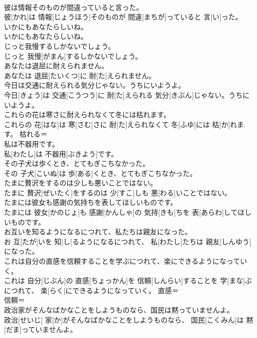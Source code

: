 \documentclass[8pt]{extreport}
\begin{document}
\begin{CJK}{UTF8}{min}
\\	彼は情報そのものが間違っていると言った。	
\\	彼[かれ]は 情報[じょうほう]そのものが 間違[まちが]っていると 言[い]った。	
\\	いかにもあなたらしいね。	
\\	いかにもあなたらしいね。	
\\	じっと我慢するしかないでしょう。	
\\	じっと 我慢[がまん]するしかないでしょう。	
\\	あなたは退屈に耐えられません。	
\\	あなたは 退屈[たいくつ]に 耐[た]えられません。	
\\	今日は交通に耐えられる気分じゃない。うちにいようよ。	
\\	今日[きょう]は 交通[こうつう]に 耐[た]えられる 気分[きぶん]じゃない。うちにいようよ。	
\\	これらの花は寒さに耐えられなくて冬には枯れます。	
\\	これらの 花[はな]は 寒[さむ]さに 耐[た]えられなくて 冬[ふゆ]には 枯[か]れます。	枯れる＝ 
\\	私は不器用です。	
\\	私[わたし]は 不器用[ぶきよう]です。	
\\	その子犬は歩くとき、とてもぎこちなかった。	
\\	その 子犬[こいぬ]は 歩[ある]くとき、とてもぎこちなかった。	
\\	たまに贅沢をするのは少しも悪いことではない。	
\\	たまに 贅沢[ぜいたく]をするのは 少[すこ]しも 悪[わる]いことではない。	
\\	たまには彼女も感謝の気持ちを表してほしいものです。	
\\	たまには 彼女[かのじょ]も 感謝[かんしゃ]の 気持[きも]ちを 表[あらわ]してほしいものです。	
\\	お互いを知るようになるにつれて、私たちは親友になった。	
\\	お 互[たが]いを 知[し]るようになるにつれて、 私[わたし]たちは 親友[しんゆう]になった。	
\\	これは自分の直感を信頼することを学ぶにつれて、楽にできるようになっていく。	
\\	これは 自分[じぶん]の 直感[ちょっかん]を 信頼[しんらい]することを 学[まな]ぶにつれて、 楽[らく]にできるようになっていく。	直感＝ 
\\	信頼＝ 
\\	政治家がそんなばかなことをしようものなら、国民は黙っていませんよ。	
\\	政治[せいじ] 家[か]がそんなばかなことをしようものなら、 国民[こくみん]は 黙[だま]っていませんよ。	

\end{CJK}
\end{document}
